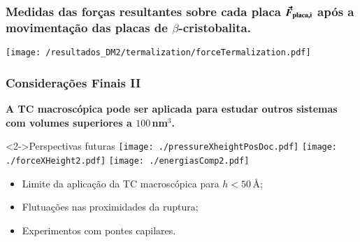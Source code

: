 \documentclass[8pt]{beamer}
\begin{document}
\appendix

\section{}

\begin{frame}
\frametitle{\textbf{Medidas das forças resultantes sobre cada placa} $\boldsymbol{\vec{F}_{\rm placa,i}}$ após a movimentação das placas de $\beta$-cristobalita.}	
	\begin{center}
		\texttt{[image: /resultados\_DM2/termalization/forceTermalization.pdf]}
	\end{center}
\end{frame}

\begin{frame}
\frametitle{Considerações Finais II}
		\begin{center}
			{\bf A TC macroscópica pode ser aplicada para estudar outros sistemas com volumes superiores a $100$\,nm$^3$.}
		\end{center}
		\begin{block}<2->{Perspectivas futuras}
			\texttt{[image: ./pressureXheightPosDoc.pdf]}
			\texttt{[image: ./forceXHeight2.pdf]}
			\texttt{[image: ./energiasComp2.pdf]}\\
			\begin{minipage}{0.64\textwidth}
				\begin{itemize}
					\item<2-> \small Limite da aplicação da TC macroscópica para $h<50$\,\AA; 	
					\item<3-> Flutuações nas proximidades da ruptura;
					\item<4-> Experimentos com pontes capilares.
				\end{itemize}
			\end{minipage}			
			\begin{minipage}{0.35\textwidth}
	        \end{minipage}
		\end{block}
\end{frame}
\end{document}
